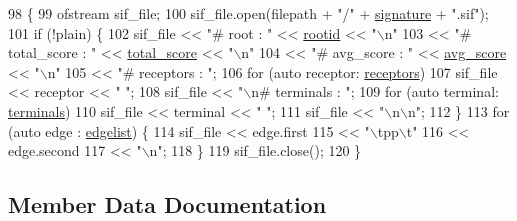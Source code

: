\begin{DoxyCode}
98                                                       \{
99     ofstream sif\_file;
100     sif\_file.open(filepath + \textcolor{stringliteral}{"/"} + \hyperlink{structderegnet_1_1Subgraph_aae642b8b0b71de5539218040b0d7e201}{signature} + \textcolor{stringliteral}{".sif"});
101     \textcolor{keywordflow}{if} (!plain) \{
102         sif\_file << \textcolor{stringliteral}{"# root : "} << \hyperlink{structderegnet_1_1Subgraph_a0e214a14649dcd35959c619cbdd9ce2b}{rootid} << \textcolor{stringliteral}{"\(\backslash\)n"}
103                  << \textcolor{stringliteral}{"# total\_score : "} << \hyperlink{structderegnet_1_1Subgraph_a3fdd10c0e803822ae09a71e5b549e471}{total\_score} << \textcolor{stringliteral}{"\(\backslash\)n"}
104                  << \textcolor{stringliteral}{"# avg\_score : "} << \hyperlink{structderegnet_1_1Subgraph_ad2836fb4bf0db09a91363f5fc894a02a}{avg\_score} << \textcolor{stringliteral}{"\(\backslash\)n"}
105                  << \textcolor{stringliteral}{"# receptors : "};
106         \textcolor{keywordflow}{for} (\textcolor{keyword}{auto} receptor: \hyperlink{structderegnet_1_1Subgraph_a2a818ffe02ceced905ef38cb9a5253df}{receptors})
107             sif\_file << receptor << \textcolor{stringliteral}{" "};
108         sif\_file << \textcolor{stringliteral}{"\(\backslash\)n# terminals : "};
109         \textcolor{keywordflow}{for} (\textcolor{keyword}{auto} terminal: \hyperlink{structderegnet_1_1Subgraph_a030ed025dd1e2e38c48147283a93bd61}{terminals})
110             sif\_file << terminal << \textcolor{stringliteral}{" "};
111         sif\_file << \textcolor{stringliteral}{"\(\backslash\)n\(\backslash\)n"};
112     \}
113     \textcolor{keywordflow}{for} (\textcolor{keyword}{auto} edge : \hyperlink{structderegnet_1_1Subgraph_a918a816236f30355b2ec812af629db09}{edgelist}) \{
114         sif\_file << edge.first
115                  << \textcolor{stringliteral}{"\(\backslash\)tpp\(\backslash\)t"}
116                  << edge.second
117                  << \textcolor{stringliteral}{"\(\backslash\)n"};
118     \}
119     sif\_file.close();
120 \}
\end{DoxyCode}


\subsection{Member Data Documentation}
\mbox{\label{structderegnet_1_1Subgraph_ad2836fb4bf0db09a91363f5fc894a02a}} 
